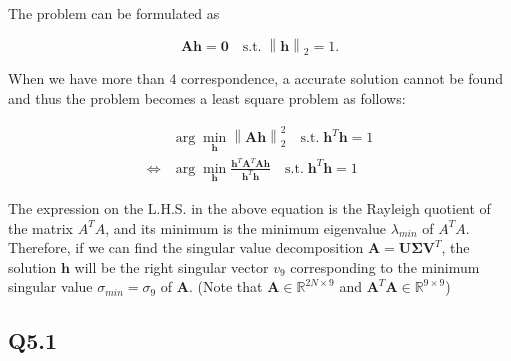 \documentclass[11pt]{article}
\begin{document}
\newcommand{\norm}[1]{\left\lVert#1\right\rVert}

The problem can be formulated as

\begin{equation}
    \mathbf{Ah} = \mathbf{0} \quad
    \textrm{s.t.} \; \norm{\mathbf{h}}_2 = 1 .
\end{equation}

When we have more than 4 correspondence, a accurate solution cannot be found and thus the problem becomes a least square problem as follows:

\begin{align}
    & \arg\min_{\mathbf{h}} \norm{\mathbf{Ah}}^2_2
    \quad \textrm{s.t.} \; \mathbf{h}^T \mathbf{h} = 1
    \\ \Leftrightarrow
    & \arg\min_{\mathbf{h}}
    \frac{\mathbf{h}^T\mathbf{A}^T\mathbf{A}\mathbf{h}}{\mathbf{h}^T\mathbf{h}}
    \quad \textrm{s.t.} \; \mathbf{h}^T \mathbf{h} = 1
\end{align}

The expression on the L.H.S. in the above equation is the Rayleigh quotient of the matrix $A^T A$, and its minimum is the minimum eigenvalue $\lambda_{min}$ of $A^T A$. Therefore, if we can find the singular value decomposition $\mathbf{A} = \mathbf{U\Sigma V}^T$, the solution $\mathbf{h}$ will be the right singular vector $v_9$ corresponding to the minimum singular value $\sigma_{min}=\sigma_9$ of $\mathbf{A}$. (Note that $\mathbf{A}\in \mathbb{R}^{2N\times 9}$ and $\mathbf{A}^T\mathbf{A}\in \mathbb{R}^{9\times 9}$)

\newpage

\subsection*{Q5.1}
\end{document}
